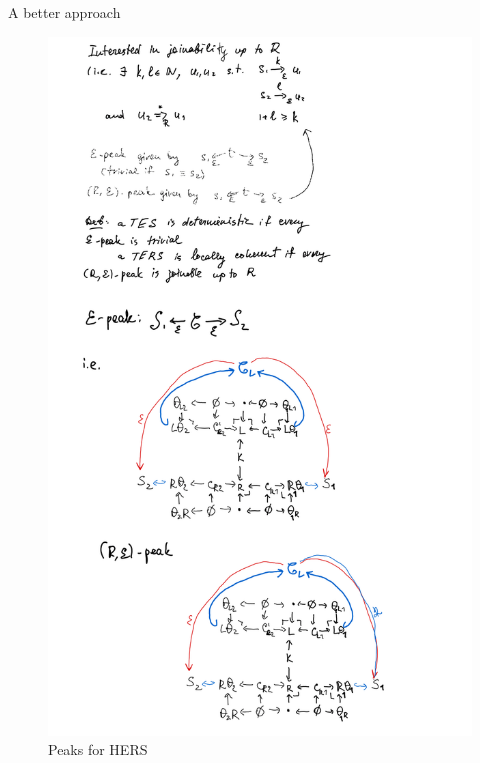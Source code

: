 \documentclass{article}
\theoremstyle{plain}
\theoremstyle{definition}
\begin{document}
\begin{section}{A better approach}
\begin{figure}[H]
\includegraphics[scale=0.8]{images/peaks.png}
\caption{Peaks for HERS}
\end{figure}


\end{section}
\end{document}
